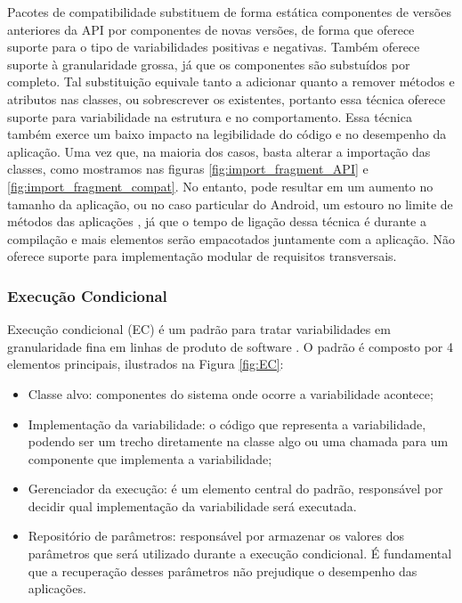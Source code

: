 Pacotes de compatibilidade substituem de forma estática componentes de versões anteriores
da API por componentes de novas versões, de forma que oferece suporte para o tipo
de variabilidades positivas e negativas. Também oferece suporte à granularidade grossa,
já que os componentes são substuídos por completo. Tal substituição equivale tanto
a adicionar
quanto a remover métodos e atributos nas classes, ou sobrescrever os existentes,
portanto essa técnica oferece suporte para variabilidade na estrutura e no comportamento.
Essa técnica também exerce um baixo impacto na legibilidade do código e no desempenho da aplicação. 
Uma vez que, na maioria dos casos, basta alterar a importação das classes, como
mostramos nas figuras \ref{fig:import_fragment_API} e \ref{fig:import_fragment_compat}.
No entanto, pode resultar em um aumento no tamanho da aplicação, ou no caso particular
do Android, um estouro no limite de métodos das aplicações \cite{multidex},
já que o tempo de ligação dessa técnica é durante a compilação e mais elementos
serão empacotados juntamente com a aplicação. Não oferece suporte para implementação
modular de requisitos transversais.

\subsubsection{Execução Condicional}
Execução condicional (EC) é um padrão para tratar variabilidades em granularidade
fina em linhas de produto de software \cite{Santos2012}. O padrão é composto
por 4 elementos principais, ilustrados na Figura \ref{fig:EC}:
\begin{itemize}
    \item Classe alvo: componentes do sistema onde ocorre a variabilidade acontece; 
    \item Implementação da variabilidade: o código que representa a variabilidade,
        podendo ser um trecho diretamente na classe algo ou uma chamada para um
        componente que implementa a variabilidade; 
    \item Gerenciador da execução: é um elemento central do padrão, responsável
        por decidir qual implementação da variabilidade será executada. 
    \item Repositório de parâmetros:  responsável por armazenar os valores dos
        parâmetros que será utilizado durante a execução condicional. É fundamental
        que a recuperação desses parâmetros não prejudique o desempenho das aplicações.
\end{itemize}

